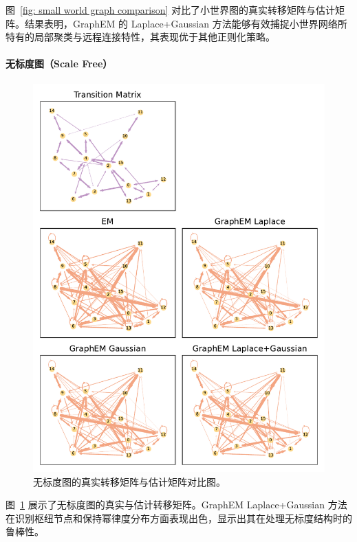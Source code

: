 图~\ref{fig: small world graph comparison} 对比了小世界图的真实转移矩阵与估计矩阵。结果表明，GraphEM 的 Laplace+Gaussian 方法能够有效捕捉小世界网络所特有的局部聚类与远程连接特性，其表现优于其他正则化策略。

\paragraph*{无标度图（Scale Free）}
\begin{figure}[tb]
    \centering
    \includegraphics[width=0.75\linewidth]{fig/scale free/graphs_for_true_and_EM.pdf}
    \caption{无标度图的真实转移矩阵与估计矩阵对比图。}
    \label{fig: scale free graph comparison}
\end{figure}

图~\ref{fig: scale free graph comparison} 展示了无标度图的真实与估计转移矩阵。GraphEM Laplace+Gaussian 方法在识别枢纽节点和保持幂律度分布方面表现出色，显示出其在处理无标度结构时的鲁棒性。


